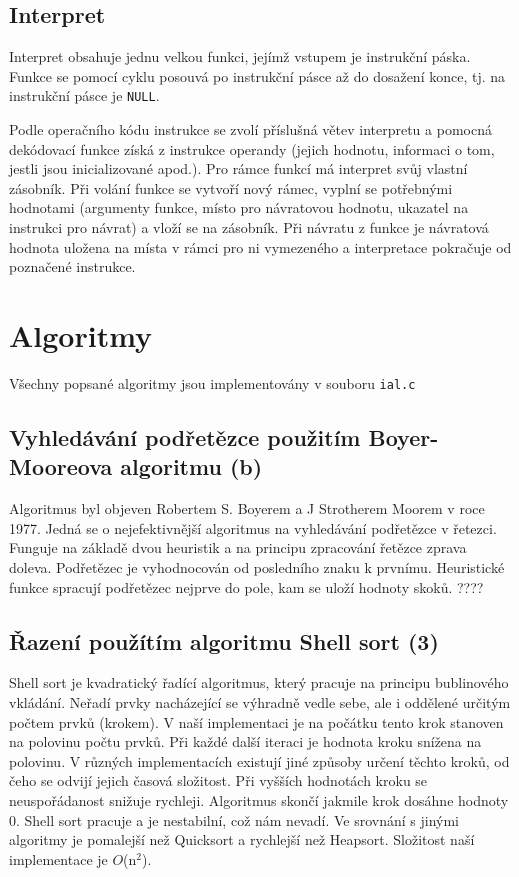 \documentclass[a4paper, 11pt]{article}
\begin{document}
    \subsection{Interpret}
    Interpret obsahuje jednu velkou funkci, jejímž vstupem je instrukční páska. Funkce se pomocí cyklu posouvá po instrukční pásce až do dosažení konce, tj. na instrukční pásce je \texttt{NULL}.\par
    Podle operačního kódu instrukce se zvolí příslušná větev interpretu a pomocná dekódovací funkce získá z instrukce operandy (jejich hodnotu, informaci o tom, jestli jsou inicializované apod.). Pro rámce funkcí má interpret svůj vlastní zásobník. Při volání funkce se vytvoří nový rámec, vyplní se potřebnými hodnotami (argumenty funkce, místo pro návratovou hodnotu, ukazatel na instrukci pro návrat) a vloží se na zásobník. Při návratu z funkce je návratová hodnota uložena na místa v rámci pro ni vymezeného a interpretace pokračuje od poznačené instrukce.
    \section{Algoritmy}
    Všechny popsané algoritmy jsou implementovány v souboru \texttt{ial.c}
    \subsection{Vyhledávání podřetězce použitím Boyer-Mooreova algoritmu (b)}
    Algoritmus byl objeven Robertem S. Boyerem a J Strotherem Moorem v roce 1977. Jedná se o nejefektivnější algoritmus na vyhledávání podřetězce v řetezci. Funguje na základě dvou heuristik a na principu zpracování řetězce zprava doleva. Podřetězec je vyhodnocován od posledního znaku k prvnímu. Heuristické funkce spracují podřetězec nejprve do pole, kam se uloží hodnoty skoků. ????
    \subsection{Řazení použítím algoritmu Shell sort (3)}
    Shell sort je kvadratický řadící algoritmus, který pracuje na principu bublinového vkládání. Neřadí prvky nacházející se výhradně vedle sebe, ale i oddělené určitým počtem prvků (krokem). V naší implementaci je na počátku tento krok stanoven na polovinu počtu prvků. Při každé další iteraci je hodnota kroku snížena na polovinu. V různých implementacích existují jiné způsoby určení těchto kroků, od čeho se odvijí jejich časová složitost. Při vyšších hodnotách kroku se neuspořádanost snižuje rychleji. Algoritmus skončí jakmile krok dosáhne hodnoty 0. Shell sort pracuje  a je nestabilní, což nám nevadí. Ve srovnání s jinými algoritmy je pomalejší než Quicksort a rychlejší než Heapsort. Složitost naší implementace je $O$(n$^2$).
\end{document}
